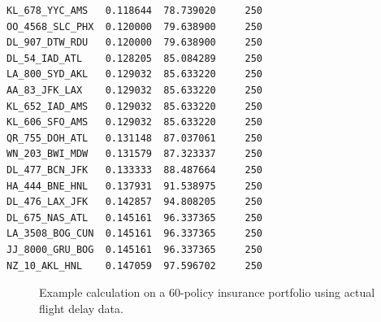 \documentclass[12pt,a4paper]{article}
\begin{document}
\begin{verbatim}
KL_678_YYC_AMS   0.118644  78.739020     250
OO_4568_SLC_PHX  0.120000  79.638900     250
DL_907_DTW_RDU   0.120000  79.638900     250
DL_54_IAD_ATL    0.128205  85.084289     250
LA_800_SYD_AKL   0.129032  85.633220     250
AA_83_JFK_LAX    0.129032  85.633220     250
KL_652_IAD_AMS   0.129032  85.633220     250
KL_606_SFO_AMS   0.129032  85.633220     250
QR_755_DOH_ATL   0.131148  87.037061     250
WN_203_BWI_MDW   0.131579  87.323337     250
DL_477_BCN_JFK   0.133333  88.487664     250
HA_444_BNE_HNL   0.137931  91.538975     250
DL_476_LAX_JFK   0.142857  94.808205     250
DL_675_NAS_ATL   0.145161  96.337365     250
LA_3508_BOG_CUN  0.145161  96.337365     250
JJ_8000_GRU_BOG  0.145161  96.337365     250
NZ_10_AKL_HNL    0.147059  97.596702     250
\end{verbatim}
\begin{figure}[H]
    \caption{\footnotesize Example calculation on a 60-policy insurance portfolio using actual flight delay data.}\label{fig2}
\end{figure}
\end{document}
